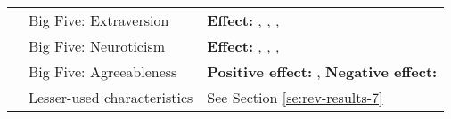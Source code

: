 \begin{table}[t!]
\begin{threeparttable}
\begin{tabular*}{\textwidth}{
    >{\raggedright}p{}
    >{\raggedright}p{}
    >{\raggedright\arraybackslash}p{}}
\cline{2-3}
& Big Five: Extraversion & 
    \textbf{Effect:} \textcite{maruskin2012}, \textcite{rickard2004}, \textcite{sumpf2015}, \textcite{williams2018} \\
    
\cline{2-3}
& Big Five: Neuroticism & 
    \textbf{Effect:} \textcite{maruskin2012}, \textcite{silvia2015}, \textcite{sumpf2015}, \textcite{williams2018} \\
    
\cline{2-3}
& Big Five: Agreeableness & 
    \textbf{Positive effect:} \textcite{sumpf2015}, \textcite{williams2018} 
    \newline 
    \textbf{Negative effect:} \textcite{maruskin2012} \\
    
\cline{2-3}
& Lesser-used characteristics & 
    See Section \ref{se:rev-results-7} \\
    
\hline

\end{tabular*}
\end{threeparttable}
\end{table}